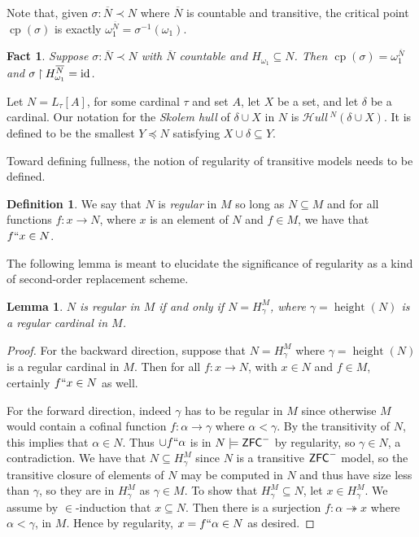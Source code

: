 \documentclass{amsart}
\newtheorem{lemma}[theorem]{Lemma}
\newtheorem{fact}[theorem]{Fact}
\theoremstyle{definition}
\newtheorem{definition}[theorem]{Definition}
\theoremstyle{remark}
\newcommand{\N}{{\overline{N}}}
\newcommand{\ZFC}{\textup{\ensuremath{\textsf{ZFC}}}}
\newcommand{\id}{\textup{\ensuremath{\text{id}}}}
\DeclareMathOperator{\height}{height}
\DeclareMathOperator{\cp}{cp}
\newcommand{\To}{\longrightarrow}
\newcommand{\rest}{\mathbin{\upharpoonright}}
\newcommand{\SH}{\mathcal{H}\textit{ull} \,}
\newcommand{\Sk}[3]{\SH^{#1}( {#2} \cup {#3} ) }
\begin{document}
Note that, given $\sigma: \N \prec N$ where $\N$ is countable and transitive, the critical point $\cp(\sigma)$ is exactly $\omega_1^{\N} = \sigma^{-1}(\omega_1)$.

\begin{fact} \label{fact:CPofourEmbeddings} Suppose $\sigma: \N \prec N$ with $\N$ countable and $H_{\omega_1} \subseteq N$. Then $\cp(\sigma)=\omega_1^{\N}$ and $\sigma \rest H_{\omega_1}^{\N} = \id$. \end{fact}

Let $N = L_\tau[A]$, for some cardinal $\tau$ and set $A$, let $X$ be a set, and let $\delta$ be a cardinal. Our notation for the \emph{Skolem hull} of $\delta \cup X$ in $N$ is $\Sk{N}{\delta}{X}$. It is defined to be the smallest $Y \preccurlyeq N$ satisfying $X \cup \delta \subseteq Y$.

Toward defining fullness, the notion of regularity of transitive models needs to be defined.

\begin{definition} We say that $N$ is \emph{regular} in $M$ so long as $N \subseteq M$ and for all functions $f: x \To N$, where $x$ is an element of $N$ and $f \in M$, we have that $f``x \in N$. \end{definition}
The following lemma is meant to elucidate the significance of regularity as a kind of second-order
replacement scheme.

\begin{lemma} \label{lemma:regularityequiv}
$N$ is regular in $M$ if and only if $N = H_\gamma^M$, where $\gamma = \height(N)$ is a regular cardinal in $M$. 
\end{lemma}
\begin{proof}
For the backward direction, suppose that $N=H_\gamma^M$ where $\gamma = \height(N)$ is a regular cardinal in $M$. Then for all $f: x \To N$, with $x \in N$ and $f \in M$, certainly $f``x \in N$ as well.

For the forward direction, indeed $\gamma$ has to be regular in $M$ since otherwise $M$ would contain a cofinal function $f: \alpha \To \gamma$ where $\alpha < \gamma$. By the transitivity of $N$, this implies that $\alpha \in N$. Thus $\cup f``\alpha$ is in $N \models \ZFC^-$ by regularity, so $\gamma \in N$, a contradiction.
We have that $N \subseteq H_{\gamma}^M$ since $N$ is a transitive $\ZFC^-$ model, so the transitive closure of elements of $N$ may be computed in $N$ and thus have size less than $\gamma$, so they are in $H_\gamma^M$ as $\gamma \in M$. To show that $H_{\gamma}^M \subseteq N$, let $x \in H_{\gamma}^M$. We assume by $\in$-induction that $x \subseteq N$. Then there is a surjection $f: \alpha \twoheadrightarrow x$ where $\alpha < \gamma$, in $M$. Hence by regularity, $x = f``\alpha \in N$ as desired.
\end{proof}
\end{document}
